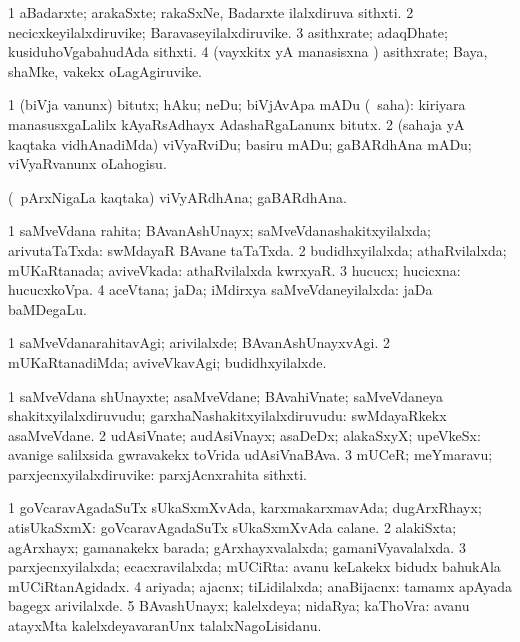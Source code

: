 \bentry
{}
\gl{\nA}
\bmng
\bnum
\num{1} aBadarxte; arakaSxte; rakaSxNe, Badarxte ilalxdiruva sithxti. 
\num{2} necicxkeyilalxdiruvike; Baravaseyilalxdiruvike. 
\num{3} asithxrate; adaqDhate; kusiduhoVgabahudAda sithxti. 
\num{4} (vayxkitx yA manasisxna \vi) asithxrate; Baya, shaMke, \mo vakekx oLagAgiruvike. 
\enum
\emng
\eentry

\bentry
{}
\gl{\sakirx}
\bmng
\bnum
\num{1} (biVja \mo vanunx) bitutx; hAku; neDu; biVjAvApa mADu (\rUpa\ saha):  kiriyara manasusxgaLalilx kAyaRsAdhayx AdashaRgaLanunx bitutx. 
\num{2} (sahaja yA kaqtaka vidhAnadiMda) viVyaRviDu; basiru mADu; gaBARdhAna mADu; viVyaRvanunx oLahogisu. 
\enum
\emng
\eentry

\bentry
{}
\gl{\nA}
\bmng
(\kanmu\ pArxNigaLa kaqtaka) viVyARdhAna; gaBARdhAna. 
\emng
\eentry

\bentry
{}
\gl{\gu}
\bmng
\bnum
\num{1} saMveVdana rahita; BAvanAshUnayx; saMveVdanashakitxyilalxda; arivutaTaTxda:  swMdayaR BAvane taTaTxda. 
\num{2} budidhxyilalxda; athaRvilalxda; mUKaRtanada; aviveVkada:  athaRvilalxda kwrxyaR. 
\num{3} hucucx; hucicxna:  hucucxkoVpa. 
\num{4} aceVtana; jaDa; iMdirxya saMveVdaneyilalxda:  jaDa baMDegaLu. 
\enum
\emng
\eentry

\bentry
{}
\gl{\kirxvi}
\bmng
\bnum
\num{1} saMveVdanarahitavAgi; arivilalxde; BAvanAshUnayxvAgi. 
\num{2} mUKaRtanadiMda; aviveVkavAgi; budidhxyilalxde. 
\enum
\emng
\eentry

\bentry
{}
\gl{\nA}
\bmng
\bnum
\num{1} saMveVdana shUnayxte; asaMveVdane; BAvahiVnate; saMveVdaneya shakitxyilalxdiruvudu; garxhaNashakitxyilalxdiruvudu:  swMdayaRkekx asaMveVdane. 
\num{2} udAsiVnate; audAsiVnayx; asaDeDx; alakaSxyX; upeVkeSx:  avanige salilxsida gwravakekx toVrida udAsiVnaBAva. 
\num{3} mUCeR; meYmaravu; parxjecnxyilalxdiruvike:  parxjAcnxrahita sithxti. 
\enum
\emng
\eentry

\bentry
{}
\gl{\gu}
\bmng
\bnum
\num{1} goVcaravAgadaSuTx sUkaSxmXvAda, karxmakarxmavAda; dugArxRhayx; atisUkaSxmX:  goVcaravAgadaSuTx sUkaSxmXvAda calane. 
\num{2} alakiSxta; agArxhayx; gamanakekx barada; gArxhayxvalalxda; gamaniVyavalalxda. 
\num{3} parxjecnxyilalxda; ecacxravilalxda; mUCiRta:  avanu keLakekx bidudx bahukAla mUCiRtanAgidadx. 
\num{4} ariyada; ajacnx; tiLidilalxda; anaBijacnx:  tamamx apAyada bagegx arivilalxde. 
\num{5} BAvashUnayx; kalelxdeya; nidaRya; kaThoVra:  avanu atayxMta kalelxdeyavaranUnx talalxNagoLisidanu. 
\enum
\emng
\eentry

